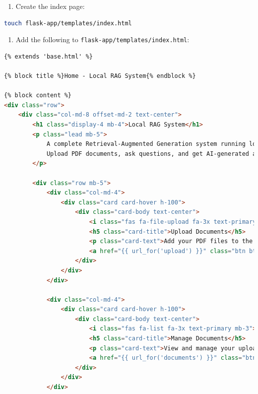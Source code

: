 \documentclass[
  screen,review,acmlarge]{acmart}
\newcommand{\passthrough}[1]{#1}
\providecommand{\tightlist}{%
  \setlength{\itemsep}{0pt}\setlength{\parskip}{0pt}}
\begin{document}
\begin{enumerate}
\def\labelenumi{\arabic{enumi}.}
\setcounter{enumi}{4}
\tightlist
\item
  Create the index page:
\end{enumerate}

\begin{lstlisting}[language=bash]
touch flask-app/templates/index.html
\end{lstlisting}

\begin{enumerate}
\def\labelenumi{\arabic{enumi}.}
\setcounter{enumi}{5}
\tightlist
\item
  Add the following to \passthrough{\lstinline!flask-app/templates/index.html!}:
\end{enumerate}

\begin{lstlisting}[language=HTML]
{% extends 'base.html' %}

{% block title %}Home - Local RAG System{% endblock %}

{% block content %}
<div class="row">
    <div class="col-md-8 offset-md-2 text-center">
        <h1 class="display-4 mb-4">Local RAG System</h1>
        <p class="lead mb-5">
            A complete Retrieval-Augmented Generation system running locally on your MacMini.
            Upload PDF documents, ask questions, and get AI-generated answers based on your documents.
        </p>
        
        <div class="row mb-5">
            <div class="col-md-4">
                <div class="card card-hover h-100">
                    <div class="card-body text-center">
                        <i class="fas fa-file-upload fa-3x text-primary mb-3"></i>
                        <h5 class="card-title">Upload Documents</h5>
                        <p class="card-text">Add your PDF files to the knowledge base.</p>
                        <a href="{{ url_for('upload') }}" class="btn btn-outline-primary">Upload Files</a>
                    </div>
                </div>
            </div>
            
            <div class="col-md-4">
                <div class="card card-hover h-100">
                    <div class="card-body text-center">
                        <i class="fas fa-list fa-3x text-primary mb-3"></i>
                        <h5 class="card-title">Manage Documents</h5>
                        <p class="card-text">View and manage your uploaded documents.</p>
                        <a href="{{ url_for('documents') }}" class="btn btn-outline-primary">View Documents</a>
                    </div>
                </div>
            </div>
            

\end{lstlisting}
\end{document}
